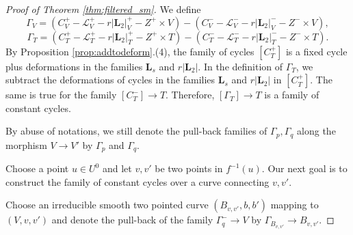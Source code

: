 \documentclass{amsart}
\theoremstyle{definition}
\theoremstyle{remark}
\begin{document}
\begin{proof}[Proof of Theorem \ref{thm:filtered_sm}]
    We define 
    \[
    \Gamma_V=(C_V^+-\mathcal{L}_V^+-r|\mathbf{L}_2|_V^+-Z^+\times V)-(C_V^--\mathcal{L}_V^--r|\mathbf{L}_2|_V^--Z^-\times V),
    \]
    \[
    \Gamma_T=(C_T^+-\mathcal{L}_T^+-r|\mathbf{L}_2|_T^+-Z^+\times T)-(C_T^--\mathcal{L}_T^--r|\mathbf{L}_2|_T^--Z^-\times T).
    \]
    By Proposition \ref{prop:addtodeform}.(4), the family of cycles $[C_T^+]$ is a fixed cycle plus deformations in the families $\mathbf{L}_s$ and $r|\mathbf{L}_2|$.
    In the definition of $\Gamma_T$, we subtract the deformations of cycles in the families $\mathbf{L}_s$ and $r|\mathbf{L}_2|$ in $[C_T^+]$.
    The same is true for the family $[C_T^-]\to T$.
    Therefore, $[\Gamma_T] \to T$ is a family of constant cycles.

    By abuse of notations, we still denote the pull-back families of $\Gamma_p, \Gamma_q$ along the morphism $V \to V'$ by $\Gamma_p$ and $\Gamma_q$.

    Choose a point $u \in U^0$ and let $v, v'$ be two points in $f^{-1}(u)$.
    Our next goal is to construct the family of constant cycles over a curve connecting $v, v'$.
    
    Choose an irreducible smooth two pointed curve $(B_{v, v'}, b, b')$ mapping to  $(V, v, v')$ and denote the pull-back of the family $\Gamma_q^- \to V$ by $\Gamma_{B_{v, v'}}\to B_{v, v'}$.
    

\end{proof}
\end{document}
